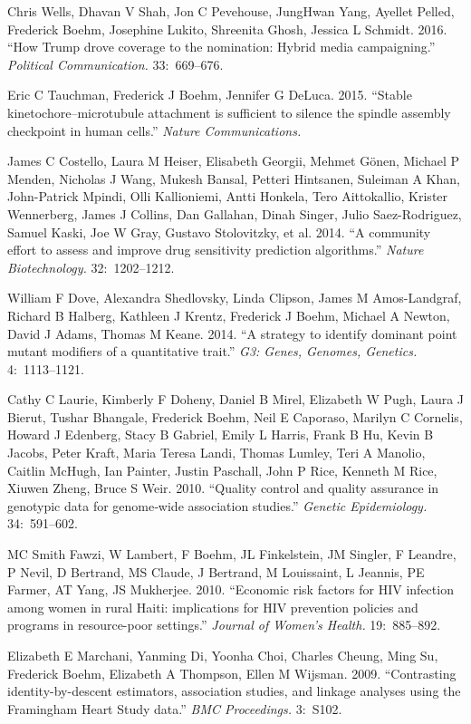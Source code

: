 \documentclass[11pt,article,oneside]{memoir}
\begin{document}
\ind Chris Wells, Dhavan V Shah, Jon C Pevehouse, JungHwan Yang, Ayellet Pelled, Frederick Boehm, Josephine Lukito, Shreenita Ghosh, Jessica L Schmidt. 2016. ``How Trump drove coverage to the nomination: Hybrid media campaigning.'' \emph{Political Communication.} 33:~669--676.

\ind Eric C Tauchman, Frederick J Boehm, Jennifer G DeLuca. 2015. ``Stable kinetochore–microtubule attachment is sufficient to silence the spindle assembly checkpoint in human cells.'' \emph{Nature Communications.}

\ind James C Costello, Laura M Heiser, Elisabeth Georgii, Mehmet Gönen, Michael P Menden, Nicholas J Wang, Mukesh Bansal, Petteri Hintsanen, Suleiman A Khan, John-Patrick Mpindi, Olli Kallioniemi, Antti Honkela, Tero Aittokallio, Krister Wennerberg, James J Collins, Dan Gallahan, Dinah Singer, Julio Saez-Rodriguez, Samuel Kaski, Joe W Gray, Gustavo Stolovitzky, et al. 2014. ``A community effort to assess and improve drug sensitivity prediction algorithms.'' \emph{Nature Biotechnology.} 32:~1202--1212.

\ind William F Dove, Alexandra Shedlovsky, Linda Clipson, James M Amos-Landgraf, Richard B Halberg, Kathleen J Krentz, Frederick J Boehm, Michael A Newton, David J Adams, Thomas M Keane. 2014. ``A strategy to identify dominant point mutant modifiers of a quantitative trait.'' \emph{G3: Genes, Genomes, Genetics.} 4:~1113--1121.

\ind Cathy C Laurie, Kimberly F Doheny, Daniel B Mirel, Elizabeth W Pugh, Laura J Bierut, Tushar Bhangale, Frederick Boehm, Neil E Caporaso, Marilyn C Cornelis, Howard J Edenberg, Stacy B Gabriel, Emily L Harris, Frank B Hu, Kevin B Jacobs, Peter Kraft, Maria Teresa Landi, Thomas Lumley, Teri A Manolio, Caitlin McHugh, Ian Painter, Justin Paschall, John P Rice, Kenneth M Rice, Xiuwen Zheng, Bruce S Weir. 2010. ``Quality control and quality assurance in genotypic data for genome‐wide association studies.'' \emph{Genetic Epidemiology.} 34:~591--602.

\ind MC Smith Fawzi, W Lambert, F Boehm, JL Finkelstein, JM Singler, F Leandre, P Nevil, D Bertrand, MS Claude, J Bertrand, M Louissaint, L Jeannis, PE Farmer, AT Yang, JS Mukherjee. 2010. ``Economic risk factors for HIV infection among women in rural Haiti: implications for HIV prevention policies and programs in resource-poor settings.'' \emph{Journal of Women's Health.} 19:~885--892.

\ind Elizabeth E Marchani, Yanming Di, Yoonha Choi, Charles Cheung, Ming Su, Frederick Boehm, Elizabeth A Thompson, Ellen M Wijsman. 2009. ``Contrasting identity-by-descent estimators, association studies, and linkage analyses using the Framingham Heart Study data.'' \emph{BMC Proceedings.} 3:~S102.
\end{document}
